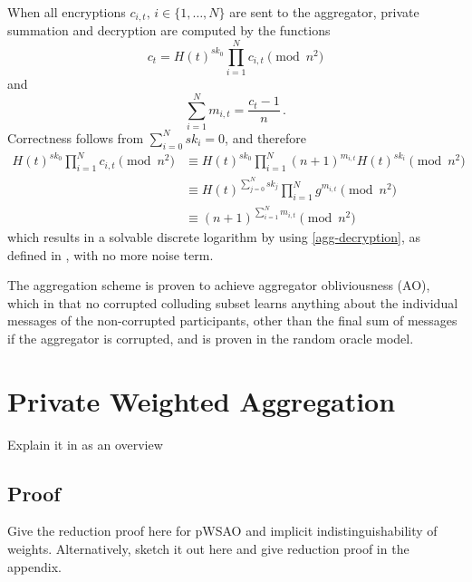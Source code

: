 \documentclass[twocolumn]{autart}    %
\begin{document}
When all encryptions $c_{i,t},\,i \in \{1,\dots,N\}$ are sent to the aggregator, private summation and decryption are computed by the functions
\begin{equation}
    c_{t} = H(t)^{sk_0}\prod^{N}_{i=1}c_{i,t} \pmod{n^2}
\end{equation}
and
\begin{equation}
    \sum^{N}_{i=1}m_{i,t} = \frac{c_{t}-1}{n}\,. \label{agg-decryption}
\end{equation}
Correctness follows from $\sum^{N}_{i=0}sk_i = 0$, and therefore
\begin{align}
    H(t)^{sk_0}\prod^{N}_{i=1}c_{i,t} \pmod{n^2} &\equiv H(t)^{sk_0}\prod^{N}_{i=1}(n+1)^{m_{i,t}} H(t)^{sk_i} \pmod{n^2} \\
    &\equiv H(t)^{\sum^N_{j=0}sk_j} \prod^{N}_{i=1}g^{m_{i,t}} \pmod{n^2} \\
    &\equiv (n+1)^{\sum^N_{i=1}m_{i,t}} \pmod{n^2}
\end{align}
which results in a solvable discrete logarithm by using \ref{agg-decryption}, as defined in \cite{joyeScalableSchemePrivacyPreserving2013}, with no more noise term.

The aggregation scheme is proven to achieve aggregator obliviousness (AO), which in that no corrupted colluding subset learns anything about the individual messages of the non-corrupted participants, other than the final sum of messages if the aggregator is corrupted, and is proven in the random oracle model.

\section{Private Weighted Aggregation}
Explain it in as an overview


\subsection{Proof}
Give the reduction proof here for pWSAO and implicit indistinguishability of weights. Alternatively, sketch it out here and give reduction proof in the appendix.
\end{document}
